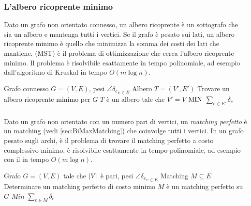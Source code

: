 \subsubsection{L'albero ricoprente minimo}
Dato un grafo non orientato connesso, un albero ricoprente è un sottografo che sia un albero e mantenga tutti i vertici.
Se il grafo è pesato sui lati, un albero ricoprente minimo è quello che minimizza la somma dei costi dei lati che mantiene.
\MinimumSpanningTree (MST) è il problema di ottimizzazione che cerca l'albero ricoprente minimo.
Il problema è risolvibile esattamente in tempo polinomiale, ad esempio dall'algoritmo di Kruskal in tempo $O(m\log n)$.

\popt{\MinimumSpanningTree}
{Grafo connesso $G=(V,E)$, pesi $\angle{\delta_e}_{e\in E}$}
{Albero $T=(V',E')$}
{Trovare un albero ricoprente minimo per $G$}
{$T$ è un albero tale che $V'=V$}
{$\mathrm{MIN}$}
{$\sum_{e\in E'} \delta_e$}

\subsubsection{\MinimumWeightPerfectMatching}
Dato un grafo non orientato con un numero pari di vertici, un \emph{matching perfetto} è un matching (vedi \ref{sec:BiMaxMatching}) che coinvolge tutti i vertici.
In un grafo pesato sugli archi, \MinimumWeightPerfectMatching è il problema di trovare il matching perfetto a costo complessivo minimo.
\MinimumWeightPerfectMatching è risolvibile esattamente in tempo polinomiale, ad esempio con il  in tempo $O(m\log n)$.

\popt{\MinimumWeightPerfectMatching}
{Grafo $G=(V,E)$ tale che $| V |$ è pari, pesi $\angle{\delta_e}_{e\in E}$}
{Matching $M\subseteq E$}
{Determinare un matching perfetto di costo minimo}
{$M$ è un matching perfetto su $G$}
{$Min$}
{$\sum_{e\in M} \delta_e$}


